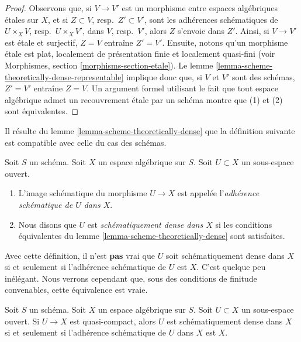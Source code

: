 \begin{proof}
Observons que, si $V \to V'$ est un morphisme entre espaces algébriques étales
sur $X$, et si $Z \subset V$, resp.\ $Z' \subset V'$, sont les adhérences schématiques
de $U \times_X V$, resp.\ $U \times_X V'$, dans $V$, resp.\ $V'$,
alors $Z$ s'envoie dans $Z'$. Ainsi, si $V \to V'$ est étale et surjectif,
$Z = V$ entraîne $Z' = V'$. Ensuite, notons qu'un morphisme étale est
plat, localement de présentation finie et localement quasi-fini
(voir Morphismes, section \ref{morphisms-section-etale}).
Le lemme \ref{lemma-scheme-theoretically-dense-representable}
implique donc que, si $V$ et $V'$ sont des schémas, $Z' = V'$ entraîne
$Z = V$. Un argument formel utilisant le fait que tout espace algébrique admet un
recouvrement étale par un schéma montre que (1) et (2) sont équivalentes.
\end{proof}

\noindent
Il résulte du
lemme \ref{lemma-scheme-theoretically-dense}
que la définition suivante est compatible avec celle
du cas des schémas.

\begin{definition}
\label{definition-scheme-theoretically-dense}
Soit $S$ un schéma.
Soit $X$ un espace algébrique sur $S$.
Soit $U \subset X$ un sous-espace ouvert.
\begin{enumerate}
\item L'image schématique du morphisme $U \to X$
est appelée l'{\it adhérence schématique de $U$ dans $X$}.
\item Nous disons que $U$ est {\it schématiquement dense dans $X$}
si les conditions équivalentes du
lemme \ref{lemma-scheme-theoretically-dense} sont satisfaites.
\end{enumerate}
\end{definition}

\noindent
Avec cette définition, il n'est {\bf pas} vrai que $U$ soit schématiquement
dense dans $X$ si et seulement si l'adhérence schématique
de $U$ est $X$. C'est quelque peu inélégant. Nous verrons cependant que,
sous des conditions de finitude convenables, cette équivalence est vraie.

\begin{lemma}
\label{lemma-scheme-theoretically-dense-quasi-compact}
Soit $S$ un schéma. Soit $X$ un espace algébrique sur $S$.
Soit $U \subset X$ un sous-espace ouvert.
Si $U \to X$ est quasi-compact, alors $U$
est schématiquement dense dans $X$ si et seulement si l'adhérence schématique
de $U$ dans $X$ est $X$.
\end{lemma}

